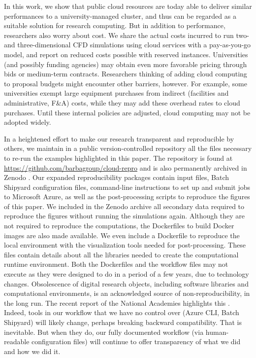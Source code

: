 \documentclass[10pt,journal,compsoc]{IEEEtran}
\begin{document}
In this work, we show that public cloud resources are today able to deliver similar performances to a university-managed cluster, and thus can be regarded as a suitable solution for research computing.
But in addition to performance, researchers also worry about cost.
We share the actual costs incurred to run two- and three-dimensional CFD simulations  using cloud services with a pay-as-you-go model, and report on reduced costs possible with reserved instances.
Universities (and possibly funding agencies) may obtain even more favorable pricing through bids or medium-term contracts.
Researchers thinking of adding cloud computing to proposal budgets might encounter other barriers, however.
For example, some universities exempt large equipment purchases from indirect (facilities and administrative, F\&A)  costs, while they may add these overhead rates to cloud purchases. 
Until these internal policies are adjusted, cloud computing may not be adopted widely.

In a heightened effort to make our research transparent and reproducible by others, we maintain in a public version-controlled repository all the files necessary to re-run the examples highlighted in this paper.
The repository is found at \url{https://github.com/barbagroup/cloud-repro} and is also permanently archived in Zenodo \cite{cloud_repro_2019}.
Our expanded reproducibility packages contain input files, Batch Shipyard configuration files, command-line instructions to set up and submit jobs to Microsoft Azure, as well as the post-processing scripts to reproduce the figures of this paper.
We included in the Zenodo archive all secondary data required to reproduce the figures without running the simulations again.
Although they are not required to reproduce the computations, the Dockerfiles to build Docker images are also made available. 
We even include a Dockerfile to reproduce the local environment with the visualization tools needed for post-processing.
These files contain details about all the libraries needed to create the computational runtime environment. 
Both the Dockerfiles and the workflow files may not execute as they were designed to do in a period of a few years, due to technology changes.
Obsolescence of digital research objects, including software libraries and computational environments, is an acknowledged source of non-reproducibility, in the long run. 
The recent report of the National Academies highlights this \cite[p.~57]{nasem_2019}. 
Indeed, tools in our workflow that we have no control over (Azure CLI, Batch Shipyard) will likely change, perhaps breaking backward compatibility. 
That is inevitable. 
But when they do, our fully documented workflow (via human-readable configuration files) will continue to offer transparency of what we did and how we did it.
\end{document}
